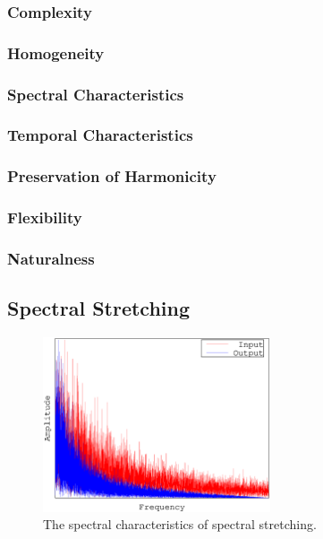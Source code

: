 		\subsubsection*{Complexity}
		\subsubsection*{Homogeneity}
		\subsubsection*{Spectral Characteristics}
		\subsubsection*{Temporal Characteristics}
		\subsubsection*{Preservation of Harmonicity}
		\subsubsection*{Flexibility}
		\subsubsection*{Naturalness}

	\subsection{Spectral Stretching}
	\label{sec:Excitation-SpectralStretching}

		\begin{figure}[h!]
			\centering
			\includegraphics[width=0.6\textwidth]{chapter3/Images/SpectralStretching.eps}
			\caption{The spectral characteristics of spectral stretching.}
			\label{fig:SpectralStretching}
		\end{figure}

